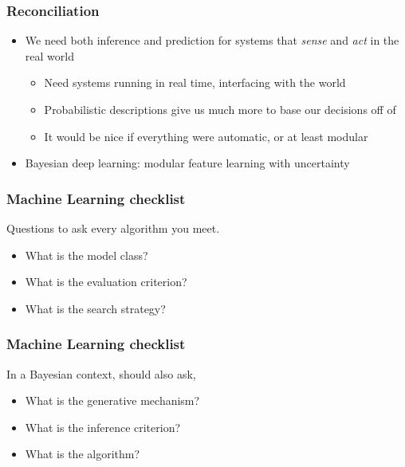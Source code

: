 \documentclass[10pt,mathserif]{beamer}
\begin{document}
\begin{frame}
  \frametitle{Reconciliation}
  \begin{itemize}
  \item We need both inference and prediction for systems that \textit{sense}
    and \textit{act} in the real world
    \begin{itemize}
    \item Need systems running in real time, interfacing with the world
    \item Probabilistic descriptions give us much more to base our decisions off of
    \item It would be nice if everything were automatic, or at least modular
    \end{itemize}
  \item Bayesian deep learning: modular feature learning with uncertainty
  \end{itemize} 
  \begin{figure}
  \end{figure}
\end{frame}

\begin{frame}
  \frametitle{Machine Learning checklist}
  Questions to ask every algorithm you meet.
 \begin{itemize}
 \item What is the model class?
 \item What is the evaluation criterion?
 \item What is the search strategy?
 \end{itemize} 
\end{frame}

\begin{frame}
  \frametitle{Machine Learning checklist}
  In a Bayesian context, should also ask,
  \begin{itemize}
  \item What is the generative mechanism? 
  \item What is the inference criterion?
  \item What is the algorithm?
  \end{itemize}
\end{frame}
\end{document}
